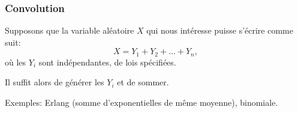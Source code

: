 \documentclass[t,usepdftitle=false]{beamer}
\begin{document}
\begin{frame}
\frametitle{Convolution}

Supposons que la variable aléatoire $X$ qui nous intéresse puisse s'écrire comme suit:
\[
X = Y_1 + Y_2 + \ldots + Y_n,
\]
où les $Y_i$ sont indépendantes, de lois spécifiées.

\mbox{}

Il suffit alors de générer les $Y_i$ et de sommer.

\mbox{}

Exemples: Erlang (somme d'exponentielles de même moyenne), binomiale.

\end{frame}
\end{document}
